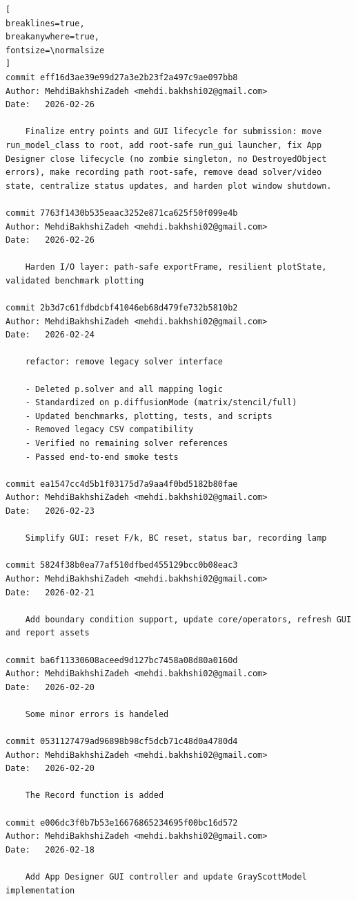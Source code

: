 \begin{Verbatim}[
breaklines=true,
breakanywhere=true,
fontsize=\normalsize
]
commit eff16d3ae39e99d27a3e2b23f2a497c9ae097bb8
Author: MehdiBakhshiZadeh <mehdi.bakhshi02@gmail.com>
Date:   2026-02-26

    Finalize entry points and GUI lifecycle for submission: move run_model_class to root, add root-safe run_gui launcher, fix App Designer close lifecycle (no zombie singleton, no DestroyedObject errors), make recording path root-safe, remove dead solver/video state, centralize status updates, and harden plot window shutdown.

commit 7763f1430b535eaac3252e871ca625f50f099e4b
Author: MehdiBakhshiZadeh <mehdi.bakhshi02@gmail.com>
Date:   2026-02-26

    Harden I/O layer: path-safe exportFrame, resilient plotState, validated benchmark plotting

commit 2b3d7c61fdbdcbf41046eb68d479fe732b5810b2
Author: MehdiBakhshiZadeh <mehdi.bakhshi02@gmail.com>
Date:   2026-02-24

    refactor: remove legacy solver interface
    
    - Deleted p.solver and all mapping logic
    - Standardized on p.diffusionMode (matrix/stencil/full)
    - Updated benchmarks, plotting, tests, and scripts
    - Removed legacy CSV compatibility
    - Verified no remaining solver references
    - Passed end-to-end smoke tests

commit ea1547cc4d5b1f03175d7a9aa4f0bd5182b80fae
Author: MehdiBakhshiZadeh <mehdi.bakhshi02@gmail.com>
Date:   2026-02-23

    Simplify GUI: reset F/k, BC reset, status bar, recording lamp

commit 5824f38b0ea77af510dfbed455129bcc0b08eac3
Author: MehdiBakhshiZadeh <mehdi.bakhshi02@gmail.com>
Date:   2026-02-21

    Add boundary condition support, update core/operators, refresh GUI and report assets

commit ba6f11330608aceed9d127bc7458a08d80a0160d
Author: MehdiBakhshiZadeh <mehdi.bakhshi02@gmail.com>
Date:   2026-02-20

    Some minor errors is handeled

commit 0531127479ad96898b98cf5dcb71c48d0a4780d4
Author: MehdiBakhshiZadeh <mehdi.bakhshi02@gmail.com>
Date:   2026-02-20

    The Record function is added

commit e006dc3f0b7b53e16676865234695f00bc16d572
Author: MehdiBakhshiZadeh <mehdi.bakhshi02@gmail.com>
Date:   2026-02-18

    Add App Designer GUI controller and update GrayScottModel implementation


\end{Verbatim}
